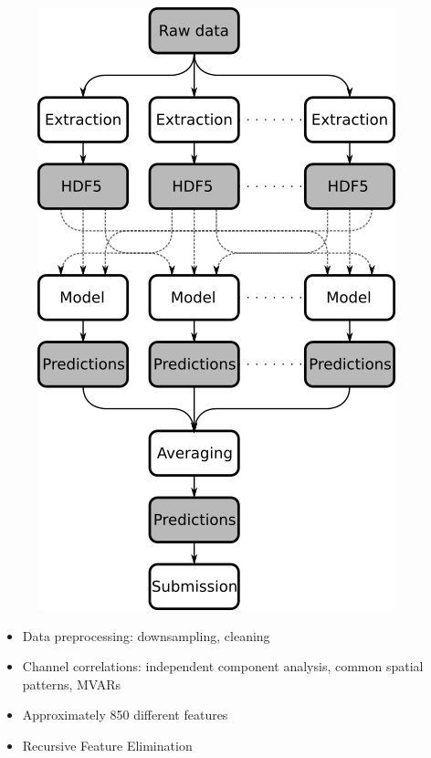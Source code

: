 \documentclass[ignorenonframetext,]{beamer}
\begin{document}
\begin{frame}

\begin{figure}[htbp]
\centering
\includegraphics{assets/presentation/GIML/hsflow.png}
\caption{}
\end{figure}

\end{frame}

\begin{frame}

\begin{itemize}
\itemsep1pt\parskip0pt
\item
  Data preprocessing: downsampling, cleaning
\item
  Channel correlations: independent component analysis, common spatial
  patterns, MVARs
\item
  Approximately 850 different features
\item
  Recursive Feature Elimination
\end{itemize}

\end{frame}
\end{document}

